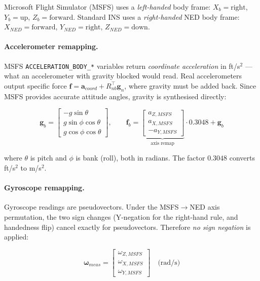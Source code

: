\documentclass[12pt,a4paper]{article}
\newcommand{\bomega}{\boldsymbol{\omega}}
\begin{document}
Microsoft Flight Simulator (MSFS) uses a \emph{left-handed} body frame:
$X_b = \text{right}$, $Y_b = \text{up}$, $Z_b = \text{forward}$.
Standard INS uses a \emph{right-handed} NED body frame:
$X_{NED} = \text{forward}$, $Y_{NED} = \text{right}$, $Z_{NED} = \text{down}$.

\paragraph{Accelerometer remapping.}
MSFS \texttt{ACCELERATION\_BODY\_*} variables return \emph{coordinate
acceleration} in ft/s$^2$ --- what an accelerometer with gravity blocked
would read. Real accelerometers output specific force
$\mathbf{f} = \mathbf{a}_{coord} + R_{nb}^\top \mathbf{g}_n$, where gravity
must be added back. Since MSFS provides accurate attitude angles, gravity is
synthesised directly:

\begin{equation}
    \mathbf{g}_b =
    \begin{bmatrix}
        -g \sin\theta \\ g \sin\phi\cos\theta \\ g\cos\phi\cos\theta
    \end{bmatrix}, \qquad
    \mathbf{f}_b =
    \underbrace{
        \begin{bmatrix} a_{Z,MSFS} \\ a_{X,MSFS} \\ -a_{Y,MSFS} \end{bmatrix}
    }_{\text{axis remap}}
    \cdot 0.3048 + \mathbf{g}_b
    \label{eq:accel_remap}
\end{equation}

where $\theta$ is pitch and $\phi$ is bank (roll), both in radians.
The factor $0.3048$ converts ft/s$^2$ to m/s$^2$.

\paragraph{Gyroscope remapping.}
Gyroscope readings are pseudovectors. Under the MSFS$\to$NED axis permutation,
the two sign changes (Y-negation for the right-hand rule, and handedness flip)
cancel exactly for pseudovectors. Therefore \emph{no sign negation} is applied:

\begin{equation}
    \bomega_{meas} =
    \begin{bmatrix} \omega_{Z,MSFS} \\ \omega_{X,MSFS} \\ \omega_{Y,MSFS} \end{bmatrix}
    \quad \text{(rad/s)}
\end{equation}
\end{document}
